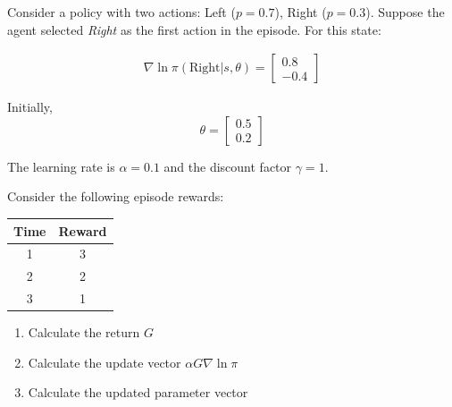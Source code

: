 \begin{exerciseboxpaper}
Consider a policy with two actions: Left ($p=0.7$), Right ($p=0.3$). Suppose the agent selected \emph{Right} as the first action in the episode. For this state:

\begin{align*}
\nabla \ln \pi(\text{Right} | s, \theta) = \begin{bmatrix}0.8 \\ -0.4\end{bmatrix}
\end{align*}

Initially, $$\theta = \begin{bmatrix}0.5 \\ 0.2\end{bmatrix}$$

The learning rate is $\alpha=0.1$ and the discount factor $\gamma = 1$.

\vspace{\baselineskip}

Consider the following episode rewards:

\begin{center}
\vspace{.5\baselineskip}

\renewcommand{\arraystretch}{1.25}
\begin{tabular}{c|c}
{\bf Time} & {\bf Reward} \\ \hline
1 & 3 \\
2 & 2 \\
3 & 1 \\
\end{tabular}
\end{center}

\vspace{.5\baselineskip}
\begin{enumerate}
   \item Calculate the return $G$
   \item Calculate the update vector $\alpha G \nabla \ln \pi$
   \item Calculate the updated parameter vector
\end{enumerate}
\end{exerciseboxpaper}

